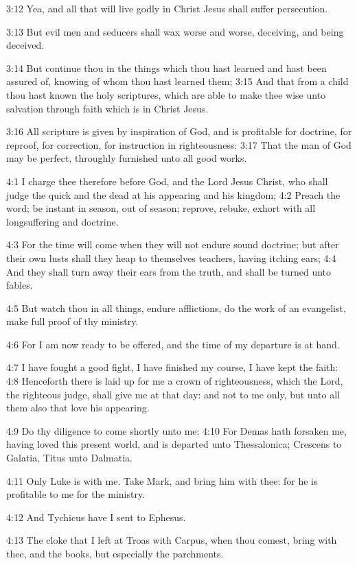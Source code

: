 3:12 Yea, and all that will live godly in Christ Jesus shall suffer persecution.

3:13 But evil men and seducers shall wax worse and worse, deceiving, and being deceived.

3:14 But continue thou in the things which thou hast learned and hast been assured of, knowing of whom thou hast learned them; 3:15 And that from a child thou hast known the holy scriptures, which are able to make thee wise unto salvation through faith which is in Christ Jesus.

3:16 All scripture is given by inspiration of God, and is profitable for doctrine, for reproof, for correction, for instruction in righteousness: 3:17 That the man of God may be perfect, throughly furnished unto all good works.

4:1 I charge thee therefore before God, and the Lord Jesus Christ, who shall judge the quick and the dead at his appearing and his kingdom; 4:2 Preach the word; be instant in season, out of season; reprove, rebuke, exhort with all longsuffering and doctrine.

4:3 For the time will come when they will not endure sound doctrine; but after their own lusts shall they heap to themselves teachers, having itching ears; 4:4 And they shall turn away their ears from the truth, and shall be turned unto fables.

4:5 But watch thou in all things, endure afflictions, do the work of an evangelist, make full proof of thy ministry.

4:6 For I am now ready to be offered, and the time of my departure is at hand.

4:7 I have fought a good fight, I have finished my course, I have kept the faith: 4:8 Henceforth there is laid up for me a crown of righteousness, which the Lord, the righteous judge, shall give me at that day: and not to me only, but unto all them also that love his appearing.

4:9 Do thy diligence to come shortly unto me: 4:10 For Demas hath forsaken me, having loved this present world, and is departed unto Thessalonica; Crescens to Galatia, Titus unto Dalmatia.

4:11 Only Luke is with me. Take Mark, and bring him with thee: for he is profitable to me for the ministry.

4:12 And Tychicus have I sent to Ephesus.

4:13 The cloke that I left at Troas with Carpus, when thou comest, bring with thee, and the books, but especially the parchments.

